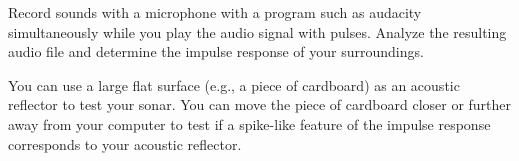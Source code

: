 \begin{enumerate}
Record sounds with a microphone with a program such as audacity
simultaneously while you play the audio signal with pulses. Analyze
the resulting audio file and determine the impulse response of your
surroundings.

You can use a large flat surface (e.g., a piece of cardboard) as an
acoustic reflector to test your sonar. You can move the piece of
cardboard closer or further away from your computer to test if a
spike-like feature of the impulse response corresponds to your
acoustic reflector.


\end{enumerate}